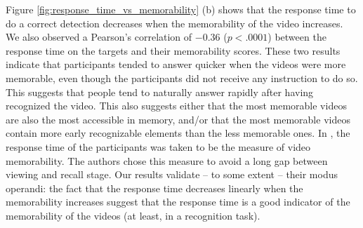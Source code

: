 \documentclass[sigconf]{acmart}
\begin{document}
Figure \ref{fig:response_time_vs_memorability} (b) shows that the response time to do a correct detection decreases when the memorability of the video increases.
We also observed a Pearson's correlation of $-0.36$ ($p<.0001$) between the response time on the targets and their memorability scores.
These two results indicate that participants tended to answer quicker when the videos were more memorable, even though the participants did not receive any instruction to do so.
This suggests that people tend to naturally answer rapidly after having recognized the video.
This also suggests either that the most memorable videos are also the most accessible in memory, and/or that the most memorable videos contain more early recognizable elements than the less memorable ones.
In \cite{shekhar_2017_show}, the response time of the participants was taken to be the measure of video memorability.
The authors chose this measure to avoid a long gap between viewing and recall stage.
Our results validate -- to some extent -- their modus operandi: the fact that the response time decreases linearly when the memorability increases suggest that the response time is a good indicator of the memorability of the videos (at least, in a recognition task). 
\end{document}
